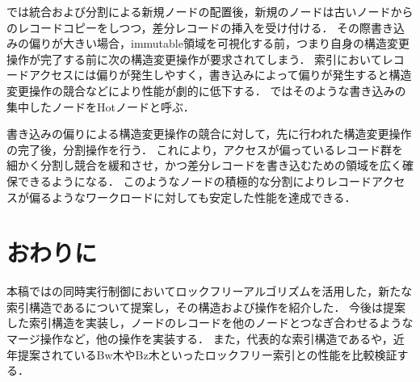 \Bctree{}では統合および分割による新規ノードの配置後，新規のノードは古いノードからのレコードコピーをしつつ，差分レコードの挿入を受け付ける．
その際書き込みの偏りが大きい場合，immutable領域を可視化する前，つまり自身の構造変更操作が完了する前に次の構造変更操作が要求されてしまう．
索引においてレコードアクセスには偏りが発生しやすく，書き込みによって偏りが発生すると構造変更操作の競合などにより性能が劇的に低下する．
\Bctree{}ではそのような書き込みの集中したノードをHotノードと呼ぶ．

書き込みの偏りによる構造変更操作の競合に対して，先に行われた構造変更操作の完了後，分割操作を行う．
これにより，アクセスが偏っているレコード群を細かく分割し競合を緩和させ，かつ差分レコードを書き込むための領域を広く確保できるようになる．
このようなノードの積極的な分割によりレコードアクセスが偏るようなワークロードに対しても安定した性能を達成できる．

\section{おわりに}
\label{sec:conclusion}

本稿では\Bptree{}の同時実行制御においてロックフリーアルゴリズムを活用した，新たな索引構造である\Bctree{}について提案し，その構造および操作を紹介した．
今後は提案した索引構造を実装し，ノードのレコードを他のノードとつなぎ合わせるようなマージ操作など，他の操作を実装する．
また，代表的な索引構造である\Bptree{}や，近年提案されているBw木やBz木といったロックフリー索引との性能を比較検証する．
